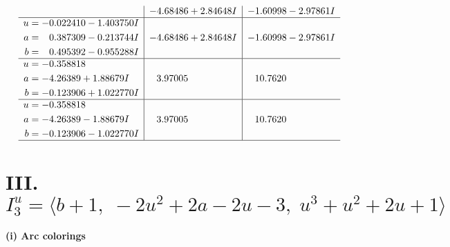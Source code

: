 \documentclass[1p]{elsarticle_modified}
\theoremstyle{definition}
\begin{document}
$$\begin{array}{c|c|c}
 & -4.68486 + 2.84648 I & -1.60998 - 2.97861 I \\ \hline\begin{aligned}
u &= -0.022410 - 1.403750 I \\
a &= \phantom{-}0.387309 - 0.213744 I \\
b &= \phantom{-}0.495392 - 0.955288 I\end{aligned}
 & -4.68486 + 2.84648 I & -1.60998 - 2.97861 I \\ \hline\begin{aligned}
u &= -0.358818\phantom{ +0.000000I} \\
a &= -4.26389 + 1.88679 I \\
b &= -0.123906 + 1.022770 I\end{aligned}
 & \phantom{-}3.97005\phantom{ +0.000000I} & \phantom{-}10.7620\phantom{ +0.000000I} \\ \hline\begin{aligned}
u &= -0.358818\phantom{ +0.000000I} \\
a &= -4.26389 - 1.88679 I \\
b &= -0.123906 - 1.022770 I\end{aligned}
 & \phantom{-}3.97005\phantom{ +0.000000I} & \phantom{-}10.7620\phantom{ +0.000000I}\\
 \hline 
 \end{array}$$\newpage\newpage\renewcommand{\arraystretch}{1}
\centering \section*{III. $I^u_{3}= \langle b+1,\;-2 u^2+2 a-2 u-3,\;u^3+u^2+2 u+1 \rangle$}
\flushleft \textbf{(i) Arc colorings}\\
\end{document}
